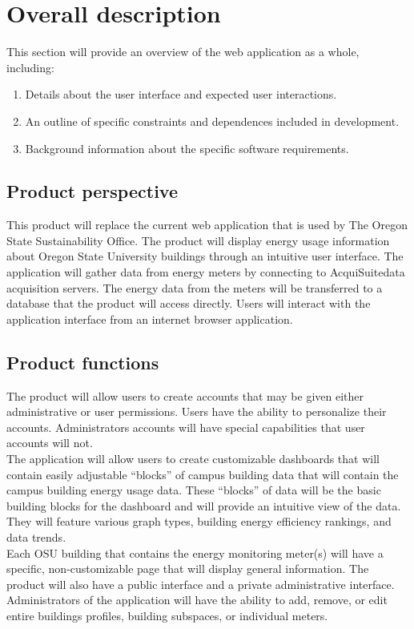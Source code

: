\documentclass[onecolumn, draftclsnofoot,10pt, compsoc]{IEEEtran}
\begin{document}
    \section{Overall description}
    This section will provide an overview of the web application as a whole, including:
        \begin{enumerate} 
            \item Details about the user interface and expected user interactions.
            \item An outline of specific constraints and dependences included in development. 
            \item Background information about the specific software requirements.
        \end{enumerate}
    \subsection{Product perspective}

    This product will replace the current web application that is used by The Oregon State Sustainability Office. The product will display energy usage information about Oregon State University buildings through an intuitive user interface. The application will gather data from energy meters by connecting to AcquiSuite\texttrademark data acquisition servers. The energy data from the meters will be transferred to a database that the product will access directly. Users will interact with the application interface from an internet browser application. 
    
    \subsection{Product functions}
    The product will allow users to create accounts that may be given either administrative or user permissions. Users have the ability to personalize their accounts. Administrators accounts will have special capabilities that user accounts will not. \\
    The application will allow users to create customizable dashboards that will contain easily adjustable “blocks” of campus building data that will contain the campus building energy usage data. These “blocks” of data will be the basic building blocks for the dashboard and will provide an intuitive view of the data. They will feature various graph types, building energy efficiency rankings, and data trends.\\
    Each OSU building that contains the energy monitoring meter(s) will have a specific, non-customizable page that will display general information. The product will also have a public interface and a private administrative interface.\\
    Administrators of the application will have the ability to add, remove, or edit entire buildings profiles, building subspaces, or individual meters.
    
\end{document}
